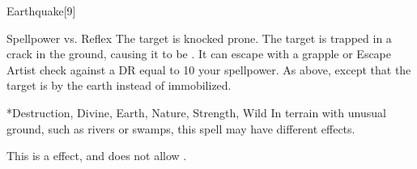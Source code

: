 \begin{spellsection}{Earthquake}[9]
    \begin{spellheader}
    \end{spellheader}
    \begin{spellcontent}
        \begin{spelltargetinginfo}
        \end{spelltargetinginfo}
        \begin{spelleffects}
            \begin{spellattack}{Spellpower vs. Reflex}
                \spelleffect The target is knocked prone.
                \spellsuccess The target is trapped in a crack in the ground, causing it to be \immobilized. It can escape with a grapple or Escape Artist check against a DR equal to 10 \add your spellpower.
                \spellcritical As above, except that the target is \grappled by the earth instead of immobilized.
            \end{spellattack}
        \end{spelleffects}
    \end{spellcontent}
    \begin{spellfooter}
        *{Destruction, Divine, Earth, Nature, Strength, Wild}
        \spellnotes In terrain with unusual ground, such as rivers or swamps, this spell may have different effects.

        This is a  effect, and does not allow .
        \miscastyou
    \end{spellfooter}
\end{spellsection}

